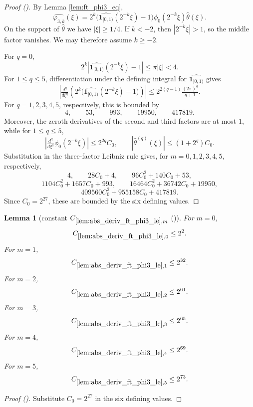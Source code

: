 \documentclass[12pt,reqno]{amsart}
\newcommand{\auto}{{({\tiny\faCar})}}
\theoremstyle{plain}
\newtheorem{lemma}[theorem]{Lemma}
\numberwithin{equation}{section}
\theoremstyle{remark}
\begin{document}
\begin{proof}[Proof \auto]
By Lemma \ref{lem:ft_phi3_eq},
\[
\widehat{\varphi_{3,k}}(\xi)
=
2^k\bigl(\widehat{\mathbf1_{[0,1)}}(2^{-k}\xi)-1\bigr)
\widehat{\phi_0}(2^{-k}\xi)\widehat\theta(\xi).
\]
On the support of $\widehat\theta$ we have $|\xi|\ge1/4$. If $k<-2$, then $|2^{-k}\xi|>1$, so the middle factor vanishes. We may therefore assume $k\ge-2$.

For $q=0$,
\[
2^k|\widehat{\mathbf1_{[0,1)}}(2^{-k}\xi)-1|
\le\pi|\xi|<4.
\]
For $1\le q\le5$, differentiation under the defining integral for $\widehat{\mathbf1_{[0,1)}}$ gives
\[
\left|\tfrac{d^q}{d\xi^q}
\left(2^k\bigl(\widehat{\mathbf1_{[0,1)}}(2^{-k}\xi)-1\bigr)\right)\right|
\le2^{2(q-1)}\tfrac{(2\pi)^q}{q+1}.
\]
For $q=1,2,3,4,5$, respectively, this is bounded by
\[
4,\qquad53,\qquad993,\qquad19950,\qquad417819.
\]
Moreover, the zeroth derivatives of the second and third factors are at most $1$, while for $1\le q\le5$,
\[
\left|\tfrac{d^q}{d\xi^q}\widehat{\phi_0}(2^{-k}\xi)\right|
\le2^{2q}C_0,
\qquad
|\widehat\theta^{(q)}(\xi)|\le(1+2^q)C_0.
\]
Substitution in the three-factor Leibniz rule gives, for $m=0,1,2,3,4,5$, respectively,
\[
4,
\qquad
28C_0+4,
\qquad
96C_0^2+140C_0+53,
\]
\[
1104C_0^2+1657C_0+993,
\qquad
16464C_0^2+36742C_0+19950,
\]
\[
409560C_0^2+955158C_0+417819.
\]
Since $C_0=2^{27}$, these are bounded by the six defining values.
\end{proof}

\begin{lemma}[constant $C_{\ref{lem:abs_deriv_ft_phi3_le},m}$ \auto]\label{constant phi three derivative}
For $m=0$,
\begin{equation}\label{constant phi three derivative bound}
C_{\ref{lem:abs_deriv_ft_phi3_le},0}\le2^2.
\end{equation}
For $m=1$,
\begin{equation}\label{auto:constant-phi-three-derivative-one}
C_{\ref{lem:abs_deriv_ft_phi3_le},1}\le2^{32}.
\end{equation}
For $m=2$,
\begin{equation}\label{auto:constant-phi-three-derivative-two}
C_{\ref{lem:abs_deriv_ft_phi3_le},2}\le2^{61}.
\end{equation}
For $m=3$,
\begin{equation}\label{auto:constant-phi-three-derivative-three}
C_{\ref{lem:abs_deriv_ft_phi3_le},3}\le2^{65}.
\end{equation}
For $m=4$,
\begin{equation}\label{auto:constant-phi-three-derivative-four}
C_{\ref{lem:abs_deriv_ft_phi3_le},4}\le2^{69}.
\end{equation}
For $m=5$,
\begin{equation}\label{auto:constant-phi-three-derivative-five}
C_{\ref{lem:abs_deriv_ft_phi3_le},5}\le2^{73}.
\end{equation}
\end{lemma}
\begin{proof}[Proof \auto]
Substitute $C_0=2^{27}$ in the six defining values.
\end{proof}
\end{document}
